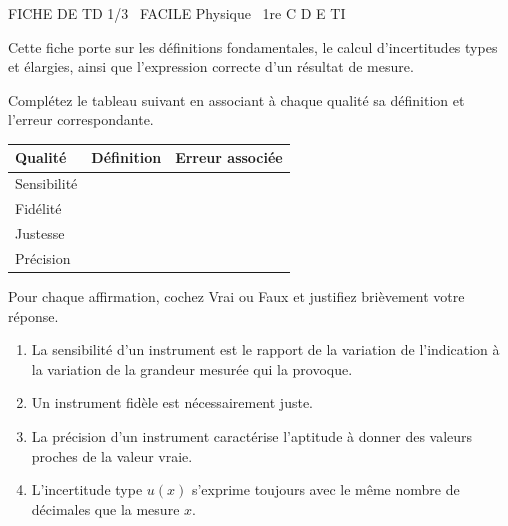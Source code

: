 \documentclass[11pt]{article}
\begin{document}
\begin{tcolorbox}[enhanced,colback=popink,colframe=popink,arc=10pt,boxrule=0pt,left=12pt,right=12pt,top=9pt,bottom=9pt]
{\color{white}\popxbold\small FICHE DE TD 1/3 \textbullet\ FACILE \hfill Physique \textbullet\ 1re C D E TI\par}
\end{tcolorbox}
\vspace{4pt}
Cette fiche porte sur les définitions fondamentales, le calcul d'incertitudes types et élargies, ainsi que l'expression correcte d'un résultat de mesure.

\begin{exercice}
Complétez le tableau suivant en associant à chaque qualité sa définition et l'erreur correspondante.
\begin{center}
\begin{tabular}{|l|p{6cm}|p{3cm}|}
\hline
\textbf{Qualité} & \textbf{Définition} & \textbf{Erreur associée} \\
\hline
Sensibilité & & \\
\hline
Fidélité & & \\
\hline
Justesse & & \\
\hline
Précision & & \\
\hline
\end{tabular}
\end{center}
\end{exercice}

\begin{exercice}
Pour chaque affirmation, cochez Vrai ou Faux et justifiez brièvement votre réponse.
\begin{enumerate}
\item La sensibilité d'un instrument est le rapport de la variation de l'indication à la variation de la grandeur mesurée qui la provoque.
\item Un instrument fidèle est nécessairement juste.
\item La précision d'un instrument caractérise l'aptitude à donner des valeurs proches de la valeur vraie.
\item L'incertitude type $u(x)$ s'exprime toujours avec le même nombre de décimales que la mesure $x$.
\end{enumerate}
\end{exercice}
\end{document}
